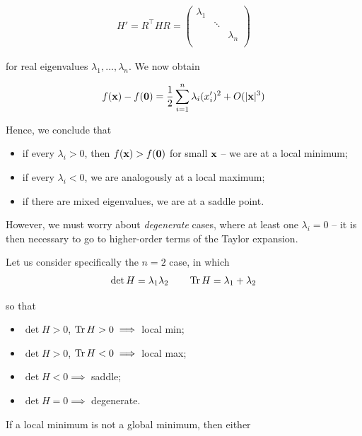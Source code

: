 \documentclass{../template/note}
\begin{document}
    \begin{align*}
        H' = R^\intercal HR = \begin{pmatrix}
            \lambda_1 &  &  \\
             & \ddots &  \\
             & & \lambda_n \\
        \end{pmatrix}
    \end{align*}
    
    for real eigenvalues $\lambda_1, \dots, \lambda_n$. We now obtain

    \begin{align*}
        f(\V x) - f(\V 0) = \frac 1 2 \sum_{i=1}^n \lambda_i (x'_i)^2 + O(|\V x|^3)
    \end{align*}
    
    Hence, we conclude that
    \begin{itemize}
        \item if every $\lambda_i > 0$, then $f(\V x) > f(\V 0)$ for small $\V x$ -- we are at a local minimum;
        \item if every $\lambda_i < 0$, we are analogously at a local maximum;
        \item if there are mixed eigenvalues, we are at a saddle point.
    \end{itemize}
    
    However, we must worry about \emph{degenerate} cases, where at least one $\lambda_i = 0$ -- it is then necessary to go to higher-order terms of the Taylor expansion.

    Let us consider specifically the $n=2$ case, in which
    \begin{align*}
        \det H = \lambda_1 \lambda_2 \qquad \operatorname{Tr} H = \lambda_1 + \lambda_2
    \end{align*}
    
    so that
    \begin{itemize}
        \item $\det H > 0$, $\operatorname{Tr} H > 0 \implies$ local min;
        \item $\det H > 0$, $\operatorname{Tr} H < 0 \implies$ local max;
        \item $\det H < 0 \implies$ saddle;
        \item $\det H = 0 \implies$ degenerate.
    \end{itemize}
    
    If a local minimum is not a global minimum, then either
\end{document}
